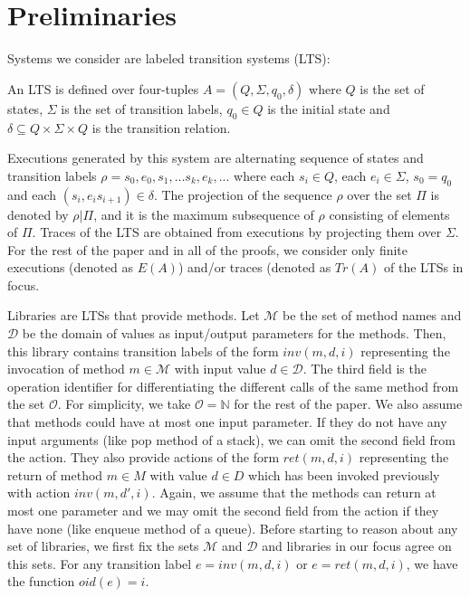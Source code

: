 \section{Preliminaries}
Systems we consider are labeled transition systems (LTS):
\begin{dfn}
An LTS is defined over four-tuples $A=(Q,\Sigma, q_0, \delta)$ where $Q$ is the set of states, $\Sigma$ is the set of transition labels, $q_0 \in Q$ is the initial state and $\delta \subseteq Q \times \Sigma \times Q$ is the transition relation.
\end{dfn}
Executions generated by this system are alternating sequence of states and transition labels $\rho = s_0, e_0, s_1,... s_k, e_k,...$ where each $s_i \in Q$, each $e_i \in \Sigma$, $s_0 = q_0$ and each $(s_i, e_i s_{i+1}) \in \delta$. The projection of the sequence $\rho$ over the set $\Pi$ is denoted by $\rho | \Pi$, and it is the maximum subsequence of $\rho$ consisting of elements of $\Pi$. Traces of the LTS are obtained from executions by projecting them over $\Sigma$. For the rest of the paper and in all of the proofs, we consider only finite executions (denoted as $E(A)$) and/or traces (denoted as $Tr(A)$ of the LTSs in focus.

Libraries are LTSs that provide methods. Let $\mathcal{M}$ be the set of method names and $\mathcal{D}$ be the domain of values as input/output parameters for the methods. Then, this library contains transition labels of the form $inv(m,d,i)$ representing the invocation of method $m \in \mathcal{M}$ with input value $d \in \mathcal{D}$. The third field is the operation identifier for differentiating the different calls of the same method from the set $\mathcal{O}$. For simplicity, we take $\mathcal{O} = \mathbb{N}$ for the rest of the paper. We also assume that methods could have at most one input parameter. If they do not have any input arguments (like pop method of a stack), we can omit the second field from the action. They also provide actions of the form $ret(m,d,i)$ representing the return of method $m \in M$ with value $d \in D$ which has been invoked previously with action $inv(m,d',i)$. Again, we assume that the methods can return at most one parameter and we may omit the second field from the action if they have none (like enqueue method of a queue). Before starting to reason about any set of libraries, we first fix the sets $\mathcal{M}$ and $\mathcal{D}$ and libraries in our focus agree on this sets. For any transition label $e = inv(m,d,i)$ or $e=ret(m,d,i)$, we have the function $oid(e) = i$.

